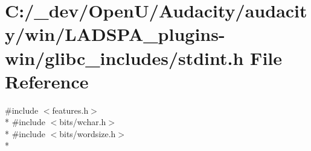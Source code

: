 \hypertarget{win_2_l_a_d_s_p_a__plugins-win_2glibc__includes_2stdint_8h}{}\section{C\+:/\+\_\+dev/\+Open\+U/\+Audacity/audacity/win/\+L\+A\+D\+S\+P\+A\+\_\+plugins-\/win/glibc\+\_\+includes/stdint.h File Reference}
\label{win_2_l_a_d_s_p_a__plugins-win_2glibc__includes_2stdint_8h}
{\ttfamily \#include $<$features.\+h$>$}\\*
{\ttfamily \#include $<$bits/wchar.\+h$>$}\\*
{\ttfamily \#include $<$bits/wordsize.\+h$>$}\\*
